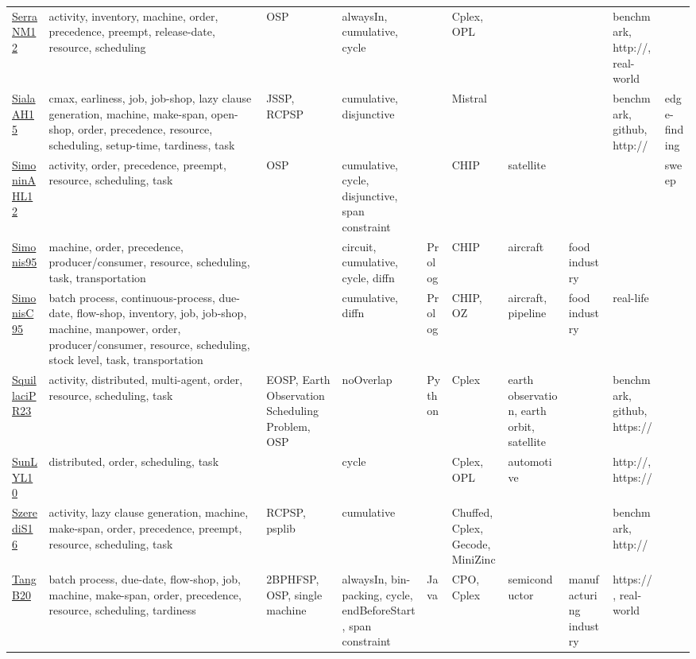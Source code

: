 {\begin{longtable}{p{3cm}p{4cm}p{2cm}p{2cm}p{2cm}p{2cm}p{2cm}p{2cm}p{2cm}p{2cm}}
\href{papers/SerraNM12.pdf}{SerraNM12}~\cite{SerraNM12} & activity, inventory, machine, order, precedence, preempt, release-date, resource, scheduling & OSP & alwaysIn, cumulative, cycle &  & Cplex, OPL &  &  & benchmark, http://, real-world & \\
\href{papers/SialaAH15.pdf}{SialaAH15}~\cite{SialaAH15} & cmax, earliness, job, job-shop, lazy clause generation, machine, make-span, open-shop, order, precedence, resource, scheduling, setup-time, tardiness, task & JSSP, RCPSP & cumulative, disjunctive &  & Mistral &  &  & benchmark, github, http:// & edge-finding\\
\href{papers/SimoninAHL12.pdf}{SimoninAHL12}~\cite{SimoninAHL12} & activity, order, precedence, preempt, resource, scheduling, task & OSP & cumulative, cycle, disjunctive, span constraint &  & CHIP & satellite &  &  & sweep\\
\href{papers/Simonis95.pdf}{Simonis95}~\cite{Simonis95} & machine, order, precedence, producer/consumer, resource, scheduling, task, transportation &  & circuit, cumulative, cycle, diffn & Prolog & CHIP & aircraft & food industry &  & \\
\href{papers/SimonisC95.pdf}{SimonisC95}~\cite{SimonisC95} & batch process, continuous-process, due-date, flow-shop, inventory, job, job-shop, machine, manpower, order, producer/consumer, resource, scheduling, stock level, task, transportation &  & cumulative, diffn & Prolog & CHIP, OZ & aircraft, pipeline & food industry & real-life & \\
\href{papers/SquillaciPR23.pdf}{SquillaciPR23}~\cite{SquillaciPR23} & activity, distributed, multi-agent, order, resource, scheduling, task & EOSP, Earth Observation Scheduling Problem, OSP & noOverlap & Python & Cplex & earth observation, earth orbit, satellite &  & benchmark, github, https:// & \\
\href{papers/SunLYL10.pdf}{SunLYL10}~\cite{SunLYL10} & distributed, order, scheduling, task &  & cycle &  & Cplex, OPL & automotive &  & http://, https:// & \\
\href{papers/SzerediS16.pdf}{SzerediS16}~\cite{SzerediS16} & activity, lazy clause generation, machine, make-span, order, precedence, preempt, resource, scheduling, task & RCPSP, psplib & cumulative &  & Chuffed, Cplex, Gecode, MiniZinc &  &  & benchmark, http:// & \\
\href{papers/TangB20.pdf}{TangB20}~\cite{TangB20} & batch process, due-date, flow-shop, job, machine, make-span, order, precedence, resource, scheduling, tardiness & 2BPHFSP, OSP, single machine & alwaysIn, bin-packing, cycle, endBeforeStart, span constraint & Java & CPO, Cplex & semiconductor & manufacturing industry & https://, real-world & \\

\end{longtable}}
